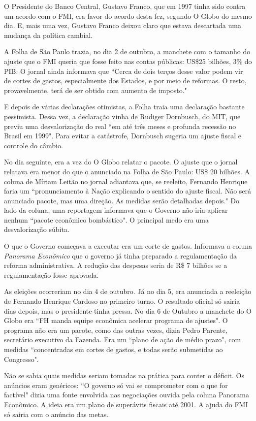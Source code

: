 \documentclass{article}
\begin{document}
O Presidente do Banco Central, Gustavo Franco, que em 1997 tinha sido contra um acordo com o FMI, era favor do acordo desta fez, segundo O Globo do mesmo dia. E, mais uma vez, Gustavo Franco deixou claro que estava descartada uma mudança da política cambial.

A Folha de São Paulo trazia, no dia 2 de outubro, a manchete com o tamanho do ajuste que o FMI queria que fosse feito nas contas públicas: US\$25 bilhões, 3\% do PIB. O jornal ainda informava que ``Cerca de dois terços desse valor podem vir de cortes de gastos, especialmente dos Estados, e por meio de reformas. O resto, provavelmente, terá de ser obtido com aumento de imposto." 

E depois de várias declarações otimistas, a Folha traia uma declaração bastante pessimista. Dessa vez, a declaração vinha de Rudiger Dornbusch, do MIT, que previu uma desvalorização do real ``em até três meses e profunda recessão no Brasil em 1999". Para evitar a catástrofe, Dornbusch sugeria um ajuste fiscal e controle do câmbio. 

No dia seguinte, era a vez do O Globo relatar o pacote. O ajuste que o jornal relatava era menor do que o anunciado na Folha de São Paulo: US\$ 20 bilhões. A coluna de Míriam Leitão no jornal adiantava que, se reeleito, Fernando Henrique faria um ``pronunciamento à Nação explicando o sentido do ajuste fiscal. Não será anunciado pacote, mas uma direção. As medidas serão detalhadas depois." Do lado da coluna, uma reportagem informava que o Governo não iria aplicar nenhum ``pacote econômico bombástico". O principal medo era uma desvalorização súbita.

O que o Governo começava a executar era um corte de gastos. Informava a coluna \textit{Panorama Econômico} que o governo já tinha preparado a regulamentação da reforma administrativa. A redução das despesas seria de R\$ 7 bilhões se a regulamentação fosse aprovada.

As eleições ocorreriam no dia 4 de outubro. Já no dia 5, era anunciada a reeleição de Fernando Henrique Cardoso no primeiro turno. O resultado oficial só sairia dias depois, mas o presidente tinha pressa. No dia 6 de Outubro a manchete do O Globo era ``FH manda equipe econômica acelerar programa de ajustes". O programa não era um pacote, como das outras vezes, dizia Pedro Parente, secretário executivo da Fazenda. Era um ``plano de ação de médio prazo", com medidas ``concentradas em cortes de gastos, e todas serão submetidas ao Congresso".

Não se sabia quais medidas seriam tomadas na prática para conter o déficit. Os anúncios eram genéricos: ``O governo só vai se comprometer com o que for factível" dizia uma fonte envolvida nas negociações ouvida pela coluna Panorama Econômico. A ideia era um plano de superávits fiscais até 2001. A ajuda do FMI só sairia com o anúncio das metas.            
 
\end{document}
